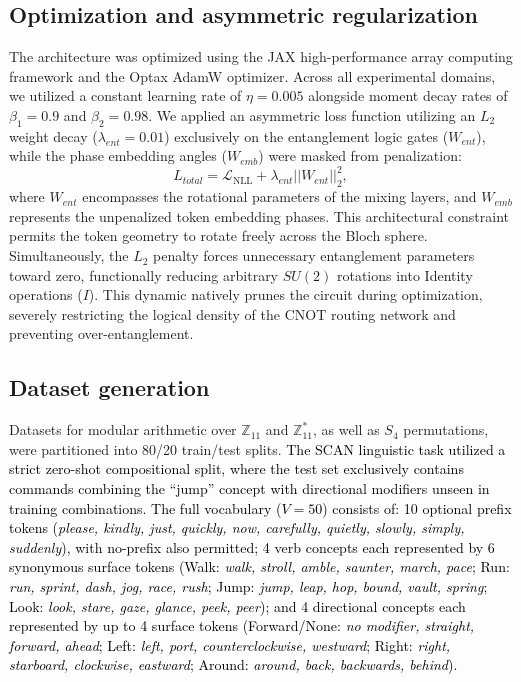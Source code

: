 \documentclass[11pt, a4paper]{article}
\begin{document}
\subsection*{Optimization and asymmetric regularization}
The architecture was optimized using the JAX high-performance array computing framework \cite{jax2018github} and the Optax AdamW optimizer. Across all experimental domains, we utilized a constant learning rate of $\eta = 0.005$ alongside moment decay rates of $\beta_1 = 0.9$ and $\beta_2 = 0.98$. We applied an asymmetric loss function utilizing an $L_2$ weight decay ($\lambda_{ent} = 0.01$) exclusively on the entanglement logic gates ($W_{ent}$), while the phase embedding angles ($W_{emb}$) were masked from penalization:
\begin{equation}
    L_{total} = \mathcal{L}_{\text{NLL}} + \lambda_{ent} ||W_{ent}||_2^2,
\end{equation}
where $W_{ent}$ encompasses the rotational parameters of the mixing layers, and $W_{emb}$ represents the unpenalized token embedding phases. This architectural constraint permits the token geometry to rotate freely across the Bloch sphere. Simultaneously, the $L_2$ penalty forces unnecessary entanglement parameters toward zero, functionally reducing arbitrary $SU(2)$ rotations into Identity operations ($I$). This dynamic natively prunes the circuit during optimization, severely restricting the logical density of the CNOT routing network and preventing over-entanglement.

\subsection*{Dataset generation} Datasets for modular arithmetic over $\mathbb{Z}_{11}$ and $\mathbb{Z}_{11}^*$, as well as $S_4$ permutations, were partitioned into 80/20 train/test splits. \textcolor{black}{The SCAN linguistic task utilized a strict zero-shot compositional split, where the test set exclusively contains commands combining the ``jump'' concept with directional modifiers unseen in training combinations. The full vocabulary ($V=50$) consists of: 10 optional prefix tokens (\textit{please, kindly, just, quickly, now, carefully, quietly, slowly, simply, suddenly}), with no-prefix also permitted; 4 verb concepts each represented by 6 synonymous surface tokens (Walk: \textit{walk, stroll, amble, saunter, march, pace}; Run: \textit{run, sprint, dash, jog, race, rush}; Jump: \textit{jump, leap, hop, bound, vault, spring}; Look: \textit{look, stare, gaze, glance, peek, peer}); and 4 directional concepts each represented by up to 4 surface tokens (Forward/None: \textit{no modifier, straight, forward, ahead}; Left: \textit{left, port, counterclockwise, westward}; Right: \textit{right, starboard, clockwise, eastward}; Around: \textit{around, back, backwards, behind}).}
\end{document}
